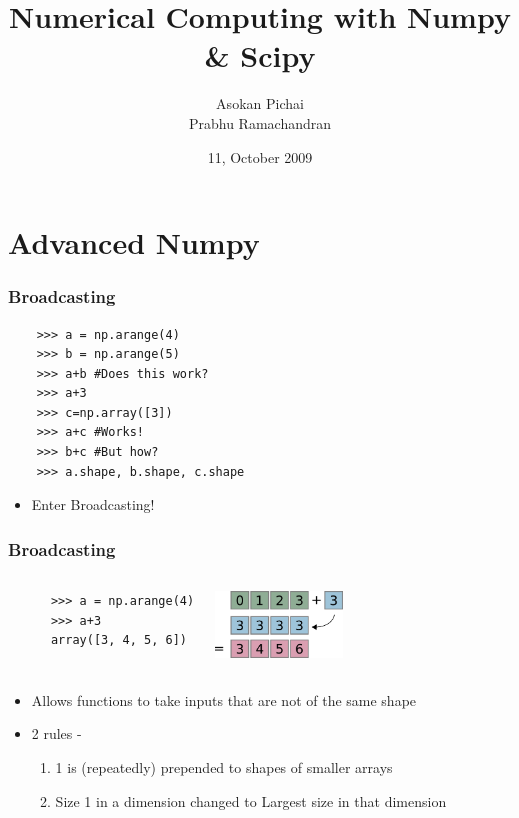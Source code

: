 \documentclass[14pt,compress]{beamer}
\title[]{Numerical Computing with Numpy \& Scipy}
\author[FOSSEE Team] {Asokan Pichai\\Prabhu Ramachandran}
\institute[IIT Bombay] {Department of Aerospace Engineering\\IIT Bombay}
\date[] {11, October 2009}
\begin{document}
\begin{frame}
  \maketitle
\end{frame}

\section{Advanced Numpy}
\begin{frame}[fragile]
  \frametitle{Broadcasting}
  \begin{lstlisting}
    >>> a = np.arange(4)
    >>> b = np.arange(5)
    >>> a+b #Does this work?
    >>> a+3
    >>> c=np.array([3])
    >>> a+c #Works!
    >>> b+c #But how?
    >>> a.shape, b.shape, c.shape
  \end{lstlisting}
  \begin{itemize}
    \item Enter Broadcasting!
  \end{itemize}
\end{frame}

\begin{frame}[fragile]
  \frametitle{Broadcasting}
  \begin{columns}
    \hspace*{-1.5in}
    \begin{lstlisting}
      >>> a = np.arange(4)
      >>> a+3
      array([3, 4, 5, 6])
    \end{lstlisting}
    \includegraphics[height=0.7in, interpolate=true]{data/broadcast_scalar}
  \end{columns}
  \begin{itemize}
    \item Allows functions to take inputs that are not of the same shape
    \item 2 rules -
      \begin{enumerate}
      \item 1 is (repeatedly) prepended to shapes of smaller arrays
      \item Size 1 in a dimension changed to Largest size in that dimension
      \end{enumerate}
  \end{itemize}
\end{frame}
\end{document}
